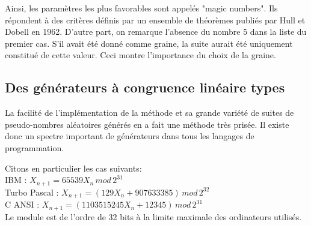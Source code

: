 \documentclass{scrartcl}
\begin{document}
Ainsi, les paramètres les plus favorables sont appelés "magic numbers". Ils répondent à des critères définis par un ensemble de théorèmes publiés par Hull et Dobell en 1962.
D'autre part, on remarque l'absence du nombre 5 dans la liste du premier cas. S'il avait été donné comme graine, la suite aurait été uniquement constitué de cette valeur. Ceci montre l'importance du choix de la graine.

\subsection{Des générateurs à congruence linéaire types}

La facilité de l'implémentation de la méthode et sa grande variété de suites de pseudo-nombres aléatoires générés en a fait une méthode très prisée.
Il existe donc un spectre important de générateurs dans tous les langages de programmation.\par
Citons en particulier les cas suivants:\\
IBM : $X_{n+1} =65539 X_{n}\, mod\, 2^{31}$\\
Turbo Pascal : $X_{n+1} =(129 X_{n} + 907633385)\, mod\, 2^{32}$\\
C ANSI : $X_{n+1} =(1103515245 X_{n}+12345)\, mod\, 2^{31}$\\
Le module est de l'ordre de 32 bits à la limite maximale des ordinateurs utilisés.
\end{document}
